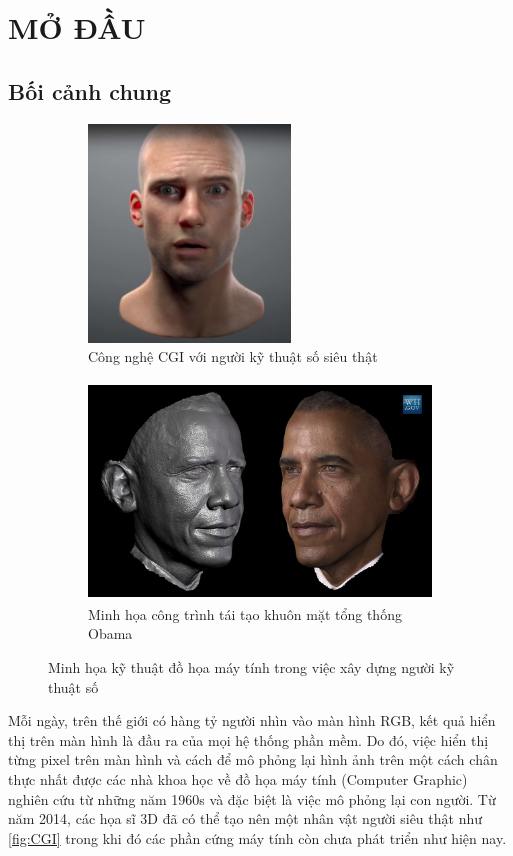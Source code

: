 
\chapter{MỞ ĐẦU}
\label{Introduction}

\section{Bối cảnh chung}


\begin{figure}[htbp]
	\centering
	\begin{subfigure}{0.35\textwidth}
		\centering
		\includegraphics[height=5.8cm]{images/cgi}
		 \caption{\small Công nghệ CGI với người kỹ thuật số siêu thật \cite{edchrisjones}}
		\label{fig:CGI}
	\end{subfigure}
	\hfill
	\begin{subfigure}{0.6\textwidth}
		\centering
		\includegraphics[height=5.8cm]{images/obama_scan}
		\caption{\small Minh họa công trình tái tạo khuôn mặt tổng thống Obama \cite{metallo2015scanning}}
		\label{fig:obamascan}
	\end{subfigure}
	\caption{Minh họa kỹ thuật đồ họa máy tính trong việc xây dựng người kỹ thuật số}
	\label{fig:DigitalHuman}
\end{figure}

Mỗi ngày, trên thế giới có hàng tỷ người nhìn vào màn hình RGB, kết quả hiển thị trên màn hình là đầu ra của mọi hệ thống phần mềm. Do đó, việc hiển thị từng pixel trên màn hình và cách để mô phỏng lại hình ảnh trên một cách chân thực nhất được các nhà khoa học về đồ họa máy tính (Computer Graphic) nghiên cứu từ những năm 1960s và đặc biệt là việc mô phỏng lại con người. Từ năm 2014, các họa sĩ 3D đã có thể tạo nên một nhân vật người siêu thật như \autoref{fig:CGI} trong khi đó các phần cứng máy tính còn chưa phát triển như hiện nay. 

